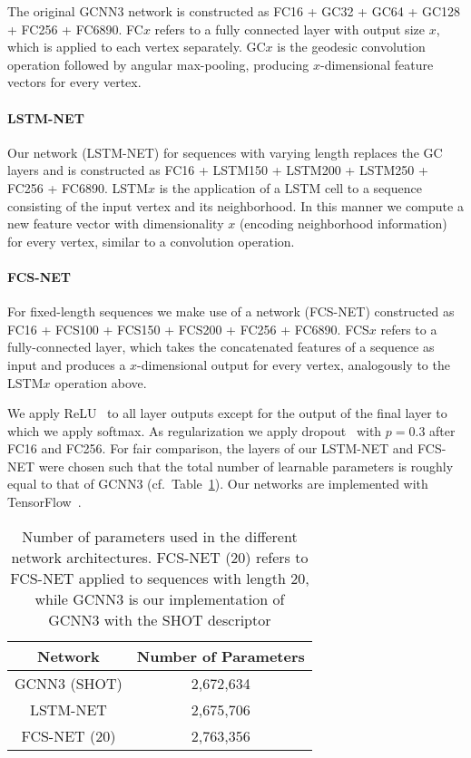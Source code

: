 \documentclass[runningheads]{llncs}
\begin{document}
The original GCNN3 \cite{masci2015geodesic} network is constructed as FC16 + GC32 + GC64 + GC128 + FC256 + FC6890. FC$x$ refers to a fully connected layer with output size $x$, which is applied to each vertex separately. GC$x$ is the geodesic convolution operation followed by angular max-pooling, producing $x$-dimensional feature vectors for every vertex.

\paragraph{\textbf{LSTM-NET}} Our network (LSTM-NET) for sequences with varying length replaces the GC layers and is constructed as FC16 + LSTM150 + LSTM200 + LSTM250 + FC256 + FC6890. LSTM$x$ is the application of a LSTM cell to a sequence consisting of the input vertex and its neighborhood. In this manner we compute a new feature vector with dimensionality $x$ (encoding neighborhood information) for every vertex, similar to a convolution operation.

\paragraph{\textbf{FCS-NET}} For fixed-length sequences we make use of a network (FCS-NET) constructed as FC16 + FCS100 + FCS150 + FCS200 + FC256 + FC6890.
FCS$x$ refers to a fully-connected layer, which takes the concatenated features of a sequence as input and produces a $x$-dimensional output for every vertex, analogously to the LSTM$x$ operation above.

We apply ReLU~\cite{nair2010rectified} to all layer outputs except for the output of the final layer to which we apply softmax. As regularization we apply dropout~\cite{srivastava2014dropout} with $p=0.3$ after FC16 and FC256. For fair comparison, the layers of our LSTM-NET and FCS-NET were chosen such that the total number of learnable parameters is roughly equal to that of GCNN3 (cf.\ Table~\ref{tab:params}). Our networks are implemented with TensorFlow~\cite{tensorflow2015-whitepaper}.
\begin{table}[tb]
\caption{Number of parameters used in the different network architectures. FCS-NET (20) refers to FCS-NET applied to sequences with length 20, while GCNN3 is our implementation of GCNN3 \cite{masci2015geodesic} with the SHOT descriptor\label{tab:params}}
\centering
\begin{tabular}{ | c | c | }
  \hline
  Network & Number of Parameters\\
  \hline
  GCNN3 (SHOT) & 2,672,634 \\
  LSTM-NET & 2,675,706 \\
  FCS-NET (20) & 2,763,356 \\
  \hline
\end{tabular}
\end{table}
\end{document}
